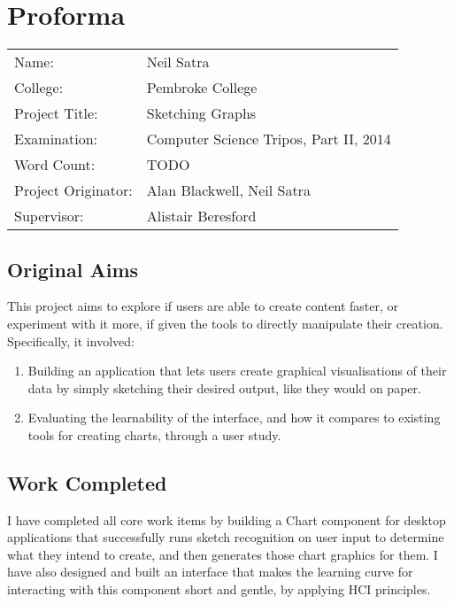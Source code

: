 \setcounter{page}{1}
\chapter*{Proforma}

\begin{tabular}{ll}
Name:               & Neil Satra					\\
College:            & Pembroke College				\\
Project Title:      & Sketching Graphs				\\
Examination:        & Computer Science Tripos, Part II, 2014        \\
Word Count:         & TODO							\\
Project Originator: & Alan Blackwell, Neil Satra        \\
Supervisor:         & Alistair Beresford				\\ 
\end{tabular}

\section*{Original Aims}
This project aims to explore if users are able to create content faster, or experiment with it more, if given the tools to directly manipulate their creation. Specifically, it involved:
\begin{enumerate}

	\item Building an application that lets users create graphical visualisations of their data by simply sketching their desired output, like they would on paper.

	\item Evaluating the learnability of the interface, and how it compares to existing tools for creating charts, through a user study.

\end{enumerate}

\section*{Work Completed}
I have completed all core work items by building a Chart component for desktop applications that successfully runs sketch recognition on user input to determine what they intend to create, and then generates those chart graphics for them. I have also designed and built an interface that makes the learning curve for interacting with this component short and gentle, by applying HCI principles. 

